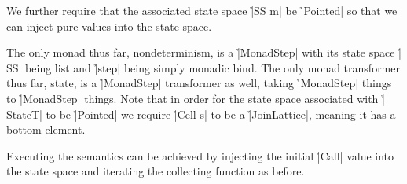 
We further require that the associated state space \h|SS m| be \h|Pointed| so
that we can inject pure values into the state space.
%


The only monad thus far, nondeterminism, is a \h|MonadStep| with its state
space \h|SS| being list and \h|step| being simply monadic bind.
%
%
The only monad transformer thus far, state, is a \h|MonadStep| transformer as
well, taking \h|MonadStep| things to \h|MonadStep| things.
%
%
Note that in order for the state space associated with \h|StateT| to be
\h|Pointed| we require \h|Cell s| to be a \h|JoinLattice|, meaning it has a
bottom element.


Executing the semantics can be achieved by injecting the initial \h|Call| value
into the state space and iterating the collecting function as before.
%
